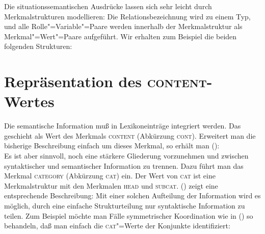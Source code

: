 Die situationssemantischen Ausdrücke lassen sich sehr leicht durch Merkmalstrukturen
modellieren: Die Relationsbezeichnung wird zu einem Typ, und alle Rolle"=Variable"=Paare
werden innerhalb der Merkmalstruktur als Merkmal"=Wert"=Paare aufgeführt. Wir erhalten
zum Beispiel die beiden folgenden Strukturen:
\ea
{}
\z

\ea
{}
\z


\section{Repräsentation des \textsc{content}-Wertes}


Die semantische Information muß in Lexikoneinträge integriert
werden. Das geschieht als Wert des Merkmals \textsc{content} (Abkürzung \textsc{cont}).
Erweitert man die bisherige Beschreibung einfach um dieses Merkmal, so erhält man ():
\ea
      \\
\z
Es ist aber sinnvoll, noch eine stärkere Gliederung vorzunehmen und zwischen syntaktischer und semantischer
Information zu trennen. Dazu führt man das Merkmal \textsc{category} (Abkürzung \textsc{cat}) ein. Der Wert
von \textsc{cat} ist eine Merkmalstruktur mit den Merkmalen \textsc{head} und \textsc{subcat}. ()
zeigt eine entsprechende Beschreibung:
\ea
\label{geom-cat-cont}
\z
Mit einer solchen Aufteilung der Information wird es möglich, durch eine einfache
Strukturteilung nur syntaktische Information zu teilen. Zum Beispiel möchte
man Fälle symmetrischer\label{page-symmetrische-koordination} Koordination wie in () so behandeln, daß
man einfach die \textsc{cat}"=Werte der Konjunkte identifiziert:
